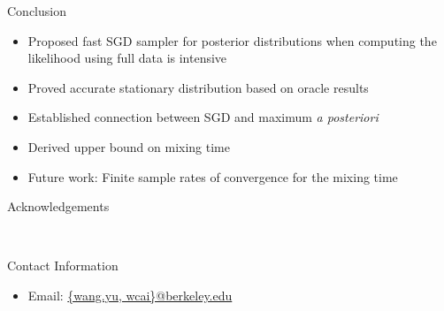 \documentclass[final]{beamer}
\newlength{\onecolwid}
\begin{document}
\begin{frame}[t]
\begin{columns}[t]
\begin{column}{\onecolwid}
\begin{block}{Conclusion}

\begin{itemize}
\item Proposed fast SGD sampler for posterior distributions when computing the likelihood using full data is intensive
\item Proved accurate stationary distribution based on oracle results
\item Established connection between SGD and maximum \emph{a posteriori}
\item Derived upper bound on mixing time
\item Future work: Finite sample rates of convergence for the mixing time
\end{itemize}

\end{block}


\begin{block}{Acknowledgements}

\small{} \\

\end{block}







\begin{block}{Contact Information}

\begin{itemize}
\item Email: \href{mailto:wang.yu@berkeley.edu, wcai@berkeley.edu}{\{wang.yu, wcai\}@berkeley.edu}
\end{itemize}


\end{block}


\end{column} %

\end{columns} %

\end{frame} %
\end{document}
